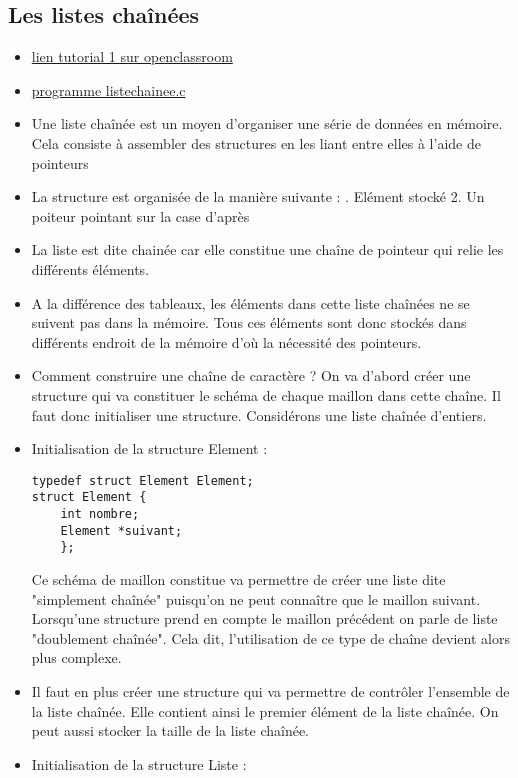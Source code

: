 \documentclass[12pt,a4paper]{article}
\begin{document}
\subsection{Les listes chaînées}
\begin{itemize}
\item \href{https://openclassrooms.com/fr/courses/19980-apprenez-a-programmer-en-c/19733-les-listes-chainees}{lien  tutorial 1 sur openclassroom}
\item \href{run:../Test C/}{programme liste\textunderscore chainee.c}
\item Une liste chaînée est un moyen d'organiser une série de données en mémoire. Cela consiste à assembler des structures en les liant entre elles à l'aide de pointeurs
\item La structure est organisée de la manière suivante :
. Elément stocké 2. Un poiteur pointant sur la case d'après
\item La liste est dite chainée car elle constitue une chaîne de pointeur qui relie les différents éléments.
\item A la différence des tableaux, les éléments dans cette liste chaînées ne se suivent pas dans la mémoire. Tous ces éléments sont donc stockés dans différents endroit de la mémoire d'où la nécessité des pointeurs.
\item Comment construire une chaîne de caractère ? On va d'abord créer une structure qui va constituer le schéma de chaque maillon dans cette chaîne. Il faut donc initialiser une structure. Considérons une liste chaînée d'entiers.
\item Initialisation de la structure Element : 
\begin{lstlisting}
typedef struct Element Element;
struct Element { 
	int nombre; 
	Element *suivant;
	};
\end{lstlisting}
Ce schéma de maillon constitue va permettre de créer une liste dite "simplement chaînée" puisqu'on ne peut connaître que le maillon suivant. Lorsqu'une structure prend en compte le maillon précédent on parle de liste "doublement chaînée". Cela dit, l'utilisation de ce type de chaîne devient alors plus complexe.
\item Il faut en plus créer une structure qui va permettre de contrôler l'ensemble de la liste chaînée. Elle contient ainsi le premier élément de la liste chaînée. On peut aussi stocker la taille de la liste chaînée.
\item Initialisation de la structure Liste :
\begin{lstlisting}

\end{lstlisting}
\end{itemize}
\end{document}
